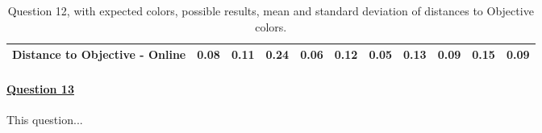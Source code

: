 \begin{table}[H]
{\begin{tabular}{lccccccccccccc}
    \multicolumn{4}{l}{Distance to Objective - Online}                                                                                               & \multicolumn{1}{|c}{\textbf{0.08}}        & \multicolumn{1}{c|}{0.11}    & \multicolumn{1}{|c}{0.24}        & \multicolumn{1}{c|}{0.06}    & \multicolumn{1}{|c}{0.12}       & \multicolumn{1}{c|}{0.05}    & \multicolumn{1}{|c}{0.13}        & \multicolumn{1}{c|}{0.09}    & \multicolumn{1}{|c}{0.15}       & \multicolumn{1}{c|}{0.09}    \\ \hline
    \end{tabular}}
  \caption[Question 12, with expected Results.]{Question 12, with expected colors, possible results, mean and standard deviation of distances to Objective colors.}
  \label{table:lab_q12_expected}
\end{table}
%
\paragraph{\ul{Question 13}}
%
This question...
%
